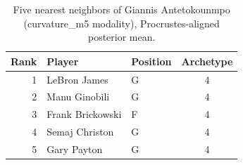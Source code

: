 \begin{table}[htbp]
  \centering\small
  \begin{tabular}{rllc}
    \toprule
    Rank & Player & Position & Archetype \\
    \midrule
    1 & LeBron James & G & 4 \\
    2 & Manu Ginobili & G & 4 \\
    3 & Frank Brickowski & F & 4 \\
    4 & Semaj Christon & G & 4 \\
    5 & Gary Payton & G & 4 \\
    \bottomrule
  \end{tabular}
  \caption{Five nearest neighbors of Giannis Antetokounmpo (curvature_m5 modality), Procrustes-aligned posterior mean.}
  \label{tab:Giannis_Antetokounmpo_neighbors_curvature_m5}
\end{table}

